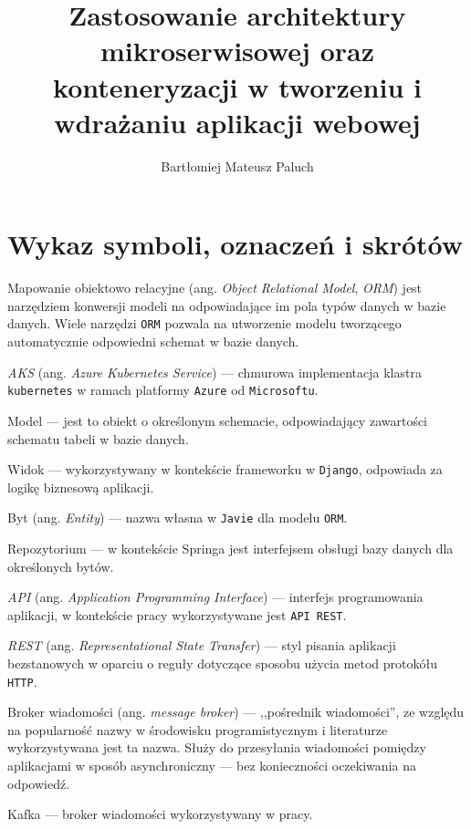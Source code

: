 \documentclass[12pt,twoside]{article}
\author{Bartłomiej Mateusz Paluch}
\title{Zastosowanie architektury mikroserwisowej oraz konteneryzacji w tworzeniu i wdrażaniu aplikacji webowej}
\begin{document}
\maketitle

\blankpage

\tableofcontents

\clearpage
\blankpage


\section*{Wykaz symboli, oznaczeń i skrótów}
%
Mapowanie obiektowo relacyjne (ang. \textit{Object Relational Model}, \textit{ORM}) jest narzędziem konwersji modeli na odpowiadające im pola typów danych w bazie danych. Wiele narzędzi \texttt{ORM} pozwala na utworzenie modelu tworzącego automatycznie odpowiedni schemat w bazie danych.

\textit{AKS} (ang. \textit{Azure Kubernetes Service}) — chmurowa implementacja klastra \texttt{kubernetes} w ramach platformy \texttt{Azure} od \texttt{Microsoftu}.

Model — jest to obiekt o określonym schemacie, odpowiadający zawartości schematu tabeli w bazie danych.

Widok — wykorzystywany w kontekście frameworku w \texttt{Django}, odpowiada za logikę biznesową aplikacji.

Byt (ang. \textit{Entity}) — nazwa własna w \texttt{Javie} dla modelu \texttt{ORM}. 

Repozytorium — w kontekście Springa jest interfejsem obsługi bazy danych dla określonych bytów.

\textit{API} (ang. \textit{Application Programming Interface}) — interfejs programowania aplikacji, w kontekście pracy wykorzystywane jest \texttt{API REST}.

\textit{REST} (ang. \textit{Representational State Transfer}) — styl pisania aplikacji bezstanowych w oparciu o reguły dotyczące sposobu użycia metod protokółu \texttt{HTTP}.

Broker wiadomości (ang. \textit{message broker}) — ,,pośrednik wiadomości'', ze względu na popularność nazwy w środowisku programistycznym i literaturze wykorzystywana jest ta nazwa. Służy do przesyłania wiadomości pomiędzy aplikacjami w sposób asynchroniczny — bez konieczności oczekiwania na odpowiedź.

Kafka — broker wiadomości wykorzystywany w pracy.
\end{document}
